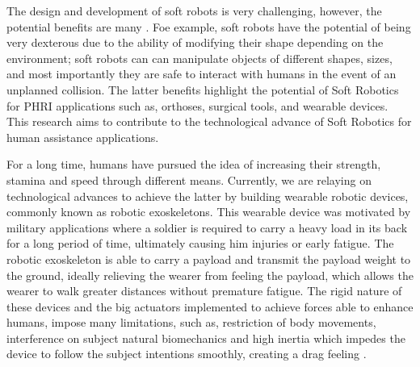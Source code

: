 The design and development of soft robots is very challenging, however, the potential benefits are many \cite{iida2011soft}. Foe example, soft robots have the potential of being very dexterous due to the ability of modifying their shape depending on the environment; soft robots can can manipulate objects of different shapes, sizes, and most importantly they are safe to interact with humans in the event of an unplanned collision. The latter benefits highlight the potential of Soft Robotics for PHRI applications such as, orthoses, surgical tools, and wearable devices. This research aims to contribute to the technological advance of Soft Robotics for human assistance applications.

For a long time, humans have pursued the idea of increasing their strength, stamina and speed through different means. Currently, we are relaying on technological advances to achieve the latter by building wearable robotic devices, commonly known as robotic exoskeletons. This wearable device was motivated by military applications where a soldier is required to carry a heavy load in its back for a long period of time, ultimately causing him injuries or early fatigue. The robotic exoskeleton is able to carry a payload and transmit the payload weight to the ground, ideally relieving the wearer from feeling the payload, which allows the wearer to walk greater distances without premature fatigue. The rigid nature of these devices and the big actuators implemented to achieve forces able to enhance humans, impose many limitations, such as, restriction of body movements, interference on subject natural biomechanics and high inertia which impedes the device to follow the subject intentions smoothly, creating a drag feeling \cite{asbeck2014stronger}.

